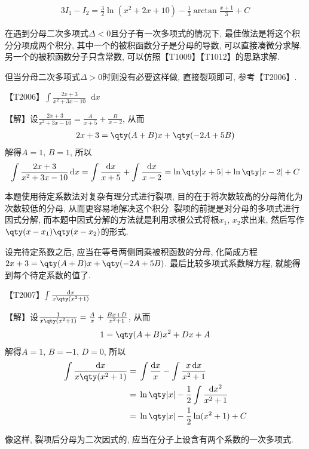 \documentclass{ctexbook}
\newcommand*{\dif}{\mathop{}\!\mathrm{d}}
\begin{document}
{\begin{align*}
3I_{1}-I_{2}=\frac{3}{2}\ln(x^{2}+2x+10)-\frac{1}{3}\arctan{\frac{x+1}{3}}+C
\end{align*}\par
{\kaishu 在遇到分母二次多项式$\Delta<0$且分子有一次多项式的情况下, 最佳做法是将这个积分分项成两个积分, 其中一个的被积函数分子是分母的导数, 可以直接凑微分求解. 另一个的被积函数分子只含常数, 可以仿照{\color{red}【T1009】}{\color{red}【T1012】}的思路求解. \par
但当分母二次多项式$\Delta>0$时则没有必要这样做, 直接裂项即可, 参考{\color{red}【T2006】}. \par}
{\color{red}【T2006】}$\int\frac{2x+3}{x^{2}+3x-10}\dif{x}$\par
【解】设$\frac{2x+3}{x^{2}+3x-10}=\frac{A}{x+5}+\frac{B}{x-2}$, 从而
\begin{align*}
2x+3=\qty(A+B)x+\qty(-2A+5B)
\end{align*}
解得$A=1,\,B=1$, 所以
\begin{align*}
\int\frac{2x+3}{x^{2}+3x-10}\dif{x}=\int\frac{\dif{x}}{x+5}+\int\frac{\dif{x}}{x-2}=\ln\qty|x+5|+\ln\qty|x-2|+C
\end{align*}\par
{\kaishu 本题使用待定系数法对复杂有理分式进行裂项, 目的在于将次数较高的分母简化为次数较低的分母, 从而更容易地解决这个积分. 裂项的前提是对分母的多项式进行因式分解, 而本题中因式分解的方法就是利用求根公式将根$x_{1},\,x_{2}$求出来, 然后写作$\qty(x-x_{1})\qty(x-x_{2})$的形式. \par 设完待定系数之后, 应当在等号两侧同乘被积函数的分母, 化简成方程$2x+3=\qty(A+B)x+\qty(-2A+5B)$. 最后比较多项式系数解方程, 就能得到每个待定系数的值了. \par}
{\color{red}【T2007】}$\int\frac{\dif{x}}{x\qty(x^{2}+1)}$\par
【解】设$\frac{1}{x\qty(x^{2}+1)}=\frac{A}{x}+\frac{Bx+D}{x^{2}+1}$, 从而
\begin{align*}
1=\qty(A+B)x^{2}+Dx+A
\end{align*}
解得$A=1,\,B=-1,\,D=0$, 所以
\begin{align*}
\int\frac{\dif{x}}{x\qty(x^{2}+1)}={}&\int\frac{\dif{x}}{x}-\int\frac{x\dif{x}}{x^{2}+1}\\
={}&\ln\qty|x|-\frac{1}{2}\int\frac{\dif{x^{2}}}{x^{2}+1}\\
={}&\ln\qty|x|-\frac{1}{2}\ln(x^{2}+1)+C
\end{align*}\par
{\kaishu 像这样, 裂项后分母为二次因式的, 应当在分子上设含有两个系数的一次多项式. \par
}}
\end{document}

